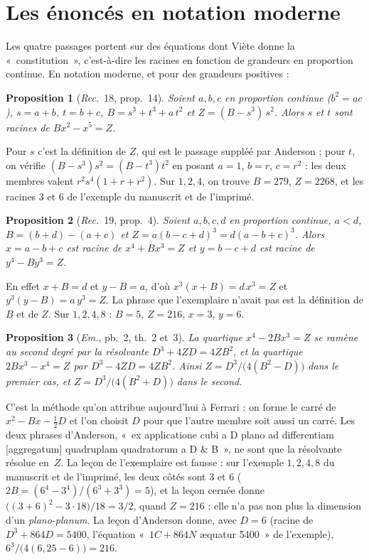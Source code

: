 \documentclass[11pt,a4paper]{article}
\newtheorem{proposition}{Proposition}
\theoremstyle{remark}
\begin{document}
\section{Les énoncés en notation moderne}\label{sec:moderne}

Les quatre passages portent sur des équations dont Viète donne la
«~constitution~», c'est-à-dire les racines en fonction de grandeurs en
proportion continue. En notation moderne, et pour des grandeurs positives :

\begin{proposition}[\emph{Rec.}~18, prop.~14]\label{prop:rec18}
Soient $a, b, c$ en proportion continue ($b^2 = ac$), $s = a + b$,
$t = b + c$, $B = s^3 + t^3 + a\,t^2$ et $Z = (B - s^3)\,s^2$. Alors
$s$ et $t$ sont racines de $B x^2 - x^5 = Z$.
\end{proposition}

\noindent Pour $s$ c'est la définition de $Z$, qui est le passage suppléé
par Anderson ; pour $t$, on vérifie $(B - s^3)s^2 = (B - t^3)t^2$ en posant
$a = 1$, $b = r$, $c = r^2$ : les deux membres valent $r^2 s^4(1 + r + r^2)$.
Sur $1, 2, 4$, on trouve $B = 279$, $Z = 2268$, et les racines $3$ et $6$ de
l'exemple du manuscrit et de l'imprimé.

\begin{proposition}[\emph{Rec.}~19, prop.~4]\label{prop:rec19}
Soient $a, b, c, d$ en proportion continue, $a < d$,
$B = (b + d) - (a + c)$ et $Z = a(b - c + d)^3 = d(a - b + c)^3$. Alors
$x = a - b + c$ est racine de $x^4 + Bx^3 = Z$ et $y = b - c + d$ est racine
de $y^4 - By^3 = Z$.
\end{proposition}

\noindent En effet $x + B = d$ et $y - B = a$, d'où $x^3(x + B) = d\,x^3 = Z$
et $y^3(y - B) = a\,y^3 = Z$. La phrase que l'exemplaire n'avait pas est la
définition de $B$ et de $Z$. Sur $1, 2, 4, 8$ : $B = 5$, $Z = 216$, $x = 3$,
$y = 6$.

\begin{proposition}[\emph{Em.}, pb.~2, th.~2 et~3]\label{prop:em}
La quartique $x^4 - 2Bx^3 = Z$ se ramène au second degré par la résolvante
$D^3 + 4ZD = 4ZB^2$, et la quartique $2Bx^3 - x^4 = Z$ par
$D^3 - 4ZD = 4ZB^2$. Ainsi $Z = D^3 / \bigl(4(B^2 - D)\bigr)$ dans le
premier cas, et $Z = D^3 / \bigl(4(B^2 + D)\bigr)$ dans le second.
\end{proposition}

\noindent C'est la méthode qu'on attribue aujourd'hui à Ferrari : on forme
le carré de $x^2 - Bx - \tfrac12 D$ et l'on choisit $D$ pour que l'autre
membre soit aussi un carré. Les deux phrases d'Anderson, «~ex applicatione
cubi a D plano ad differentiam [aggregatum] quadruplam quadratorum a D \& B~»,
ne sont que la résolvante résolue en~$Z$. La leçon de l'exemplaire est
fausse : sur l'exemple $1, 2, 4, 8$ du manuscrit et de l'imprimé, les deux
côtés sont $3$ et $6$ ($2B = (6^4 - 3^4)/(6^3 + 3^3) = 5$), et la leçon
cernée donne $\bigl((3+6)^2 - 3\cdot 18\bigr)/18 = 3/2$, quand $Z = 216$ ;
elle n'a pas non plus la dimension d'un \emph{plano-planum}. La leçon
d'Anderson donne, avec $D = 6$ (racine de $D^3 + 864D = 5400$, l'équation
«~$1C + 864N$ æquatur 5400~» de l'exemple), $6^3 / \bigl(4(6{,}25 - 6)\bigr)
= 216$.
\end{document}

